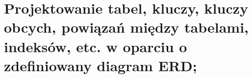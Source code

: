 \section{Projektowanie tabel, kluczy, kluczy obcych, powiązań między tabelami, indeksów, etc. w oparciu o zdefiniowany diagram ERD;} 



